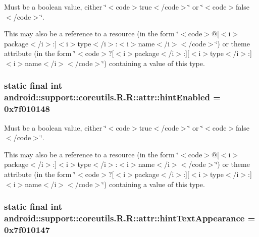 Must be a boolean value, either \char`\"{}$<$code$>$true$<$/code$>$\char`\"{} or \char`\"{}$<$code$>$false$<$/code$>$\char`\"{}. 

This may also be a reference to a resource (in the form \char`\"{}$<$code$>$@\mbox{[}$<$i$>$package$<$/i$>$:\mbox{]}$<$i$>$type$<$/i$>$:$<$i$>$name$<$/i$>$$<$/code$>$\char`\"{}) or theme attribute (in the form \char`\"{}$<$code$>$?\mbox{[}$<$i$>$package$<$/i$>$:\mbox{]}\mbox{[}$<$i$>$type$<$/i$>$:\mbox{]}$<$i$>$name$<$/i$>$$<$/code$>$\char`\"{}) containing a value of this type. \hypertarget{classandroid_1_1support_1_1coreutils_1_1_r_1_1attr_e741f6fc45980f254ae7fd6b56a280c8}{
\subsubsection[{hintEnabled}]{\setlength{\rightskip}{0pt plus 5cm}static final int android::support::coreutils.R.R::attr::hintEnabled = 0x7f010148}}
\label{classandroid_1_1support_1_1coreutils_1_1_r_1_1attr_e741f6fc45980f254ae7fd6b56a280c8}


Must be a boolean value, either \char`\"{}$<$code$>$true$<$/code$>$\char`\"{} or \char`\"{}$<$code$>$false$<$/code$>$\char`\"{}. 

This may also be a reference to a resource (in the form \char`\"{}$<$code$>$@\mbox{[}$<$i$>$package$<$/i$>$:\mbox{]}$<$i$>$type$<$/i$>$:$<$i$>$name$<$/i$>$$<$/code$>$\char`\"{}) or theme attribute (in the form \char`\"{}$<$code$>$?\mbox{[}$<$i$>$package$<$/i$>$:\mbox{]}\mbox{[}$<$i$>$type$<$/i$>$:\mbox{]}$<$i$>$name$<$/i$>$$<$/code$>$\char`\"{}) containing a value of this type. \hypertarget{classandroid_1_1support_1_1coreutils_1_1_r_1_1attr_1a8d5a107958a5e6d474258bc177e9a8}{
\subsubsection[{hintTextAppearance}]{\setlength{\rightskip}{0pt plus 5cm}static final int android::support::coreutils.R.R::attr::hintTextAppearance = 0x7f010147}}
\label{classandroid_1_1support_1_1coreutils_1_1_r_1_1attr_1a8d5a107958a5e6d474258bc177e9a8}


